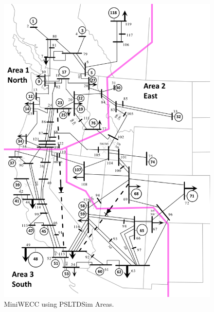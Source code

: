 \begin{figure}[H]
	\centering
	\footnotesize
	\includegraphics[width=\linewidth]{examples/miniWECC/miniWECC-split03-PSLTDSim}
	\caption{MiniWECC using PSLTDSim Areas.}
	\label{fig: mw area option 1}
\end{figure}%


